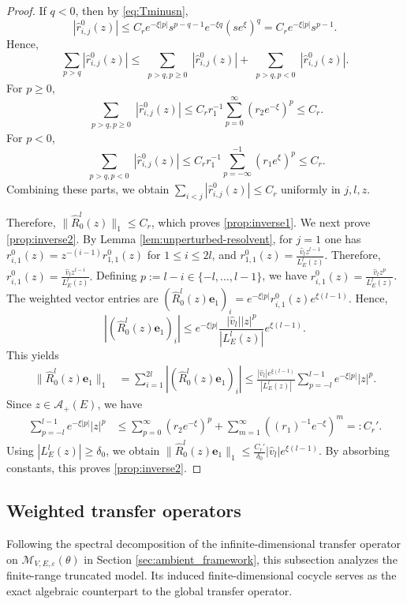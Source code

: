 \documentclass[reqno,11pt]{amsart}
\begin{document}
\begin{proof}
If $q<0$, then by \eqref{eq:Tminusn},
$$
|\widehat r_{i,j}^0(z)| \le C_r e^{-\xi|p|}s^{p-q-1}e^{-\xi q}(s e^\xi)^q = C_r e^{-\xi|p|}s^{p-1}.
$$
Hence,
$$
\sum_{p>q}|\widehat r_{i,j}^0(z)| \le \sum_{\substack{p>q, p\ge 0}}|\widehat r_{i,j}^0(z)| + \sum_{\substack{p>q, p<0}}|\widehat r_{i,j}^0(z)|.
$$
For $p\ge 0$, 
$$
\sum_{\substack{p>q, p\ge 0}}|\widehat r_{i,j}^0(z)| \le C_r r_1^{-1}\sum_{p=0}^{\infty}(r_2e^{-\xi})^p \le C_r.
$$
For $p<0$, 
$$
\sum_{\substack{p>q, p<0}}|\widehat r_{i,j}^0(z)| \le C_r r_1^{-1}\sum_{p=-\infty}^{-1}(r_1e^\xi)^p \le C_r.
$$
Combining these parts, we obtain $\sum_{i<j} |\widehat r_{i,j}^0(z)|\le C_r$ uniformly in $j,l,z$. 

Therefore, $\|\widehat R^{l}_0(z)\|_{1}\le C_r$, which proves \eqref{prop:inverse1}.
We next prove \eqref{prop:inverse2}. By Lemma \ref{lem:unperturbed-resolvent}, for $j=1$ one has $r_{i,1}^{0}(z)=z^{-(i-1)}r_{1,1}^{0}(z)$ for $1\le i\le 2l$, and $r_{1,1}^{0}(z)=\frac{\hat{v}_l z^{l-1}}{L^{l}_{E}(z)}$. Therefore,
$
r_{i,1}^{0}(z)=\frac{\hat{v}_lz^{l-i}}{L^{l}_{E}(z)}.
$
Defining $p:=l-i\in\{-l,\dots,l-1\}$, we have $r_{i,1}^{0}(z)=\frac{\hat{v}_lz^{p}}{L^{l}_{E}(z)}$. The weighted vector entries are
$
(\widehat R^{l}_0(z)\mathbf e_1)_i = e^{-\xi|p|}r_{i,1}^{0}(z)e^{\xi(l-1)}.
$
Hence,
$$
|(\widehat R^{l}_0(z)\mathbf e_1)_i| \le e^{-\xi|p|} \frac{|\hat{v}_l||z|^p}{|L^{l}_{E}(z)|} e^{\xi(l-1)}.
$$
This yields
\begin{align*}
\|\widehat R^{l}_0(z)\mathbf e_1\|_{1} &= \sum_{i=1}^{2l} |(\widehat R^{l}_0(z)\mathbf e_1)_i| \le \frac{|\hat{v}_l|e^{\xi(l-1)}}{|L^{l}_{E}(z)|} \sum_{p=-l}^{l-1} e^{-\xi|p|}|z|^p.
\end{align*}
Since $z\in \mathcal A_+(E)$, we have
\begin{align*}
\sum_{p=-l}^{l-1} e^{-\xi|p|}|z|^p &\le \sum_{p=0}^{\infty}(r_2e^{-\xi})^p + \sum_{m=1}^{\infty}((r_1)^{-1}e^{-\xi})^m =: C_r'.
\end{align*}
Using $|L^{l}_{E}(z)|\ge \delta_0$, we obtain
$
\|\widehat R^{l}_0(z)\mathbf e_1\|_{1} \le \frac{C_r'}{\delta_0}|\hat{v}_l|e^{\xi(l-1)}.
$
By absorbing constants, this proves \eqref{prop:inverse2}.
\end{proof}







\subsection{Weighted transfer operators}
Following the spectral decomposition of the infinite-dimensional transfer operator on $\mathcal{M}_{V,E,\varepsilon}(\theta)$ in Section \ref{sec:ambient_framework}, this subsection analyzes the finite-range truncated model. Its induced finite-dimensional cocycle serves as the exact algebraic counterpart to the global transfer operator.
\end{document}
